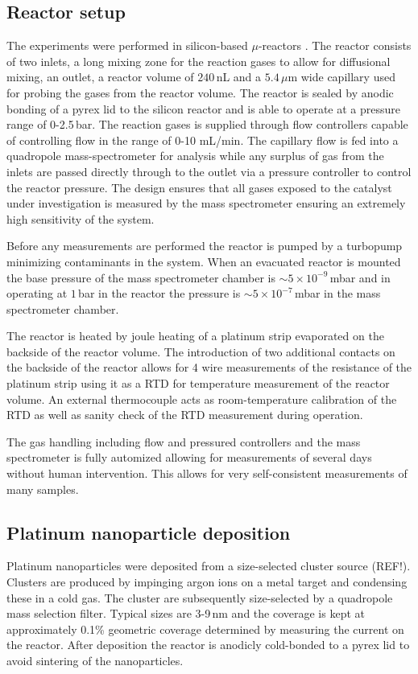 \documentclass[8.5pt,twoside,twocolumn]{article}
\begin{document}
\subsection{Reactor setup}
The experiments were performed in silicon-based $\mu$-reactors \cite{Henriksen2009}. The reactor consists of two inlets, a long mixing zone for the reaction gases to allow for diffusional mixing, an outlet, a reactor volume of $240\,$nL and a $5.4\,\mu$m wide capillary used for probing the gases from the reactor volume. The reactor is sealed by anodic bonding of a pyrex lid to the silicon reactor and is able to operate at a pressure range of 0-2.5\,bar. The reaction gases is supplied through flow controllers capable of controlling flow in the range of 0-10 mL/min. The capillary flow is fed into a quadropole mass-spectrometer for analysis while any surplus of gas from the inlets are passed directly through to the outlet via a pressure controller to control the reactor pressure. The design ensures that all gases exposed to the catalyst under investigation is measured by the mass spectrometer ensuring an extremely high sensitivity of the system. 

Before any measurements are performed the reactor is pumped by a turbopump minimizing contaminants in the system. When an evacuated reactor is mounted the base pressure of the mass spectrometer chamber is $\sim5\times10^{-9}\,$mbar and in operating at $1\,$bar in the reactor the pressure is $\sim5\times10^{-7}\,$mbar in the mass spectrometer chamber. 

The reactor is heated by joule heating of a platinum strip evaporated on the backside of the reactor volume. The introduction of two additional contacts on the backside of the reactor allows for 4 wire measurements of the resistance of the platinum strip using it as a RTD for temperature measurement of the reactor volume. An external thermocouple acts as room-temperature calibration of the RTD as well as sanity check of the RTD measurement during operation.

The gas handling including flow and pressured controllers and the mass spectrometer is fully automized allowing for measurements of several days without human intervention. This allows for very self-consistent measurements of many samples.

\subsection{Platinum nanoparticle deposition}
Platinum nanoparticles were deposited from a size-selected cluster source (REF!). Clusters are produced by impinging argon ions on a metal target and condensing these in a cold gas. The cluster are subsequently size-selected by a quadropole mass selection filter. Typical sizes are 3-9\,nm and the coverage is kept at approximately 0.1\% geometric coverage determined by measuring the current on the reactor. After deposition the reactor is anodicly cold-bonded \cite{Vesborg2010} to a pyrex lid to avoid sintering of the nanoparticles.
\end{document}
